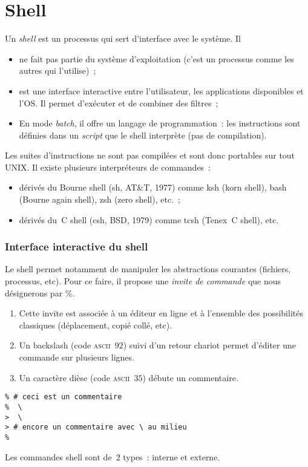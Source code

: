 \section{Shell}
\begin{frame}
Un \textit{shell} est un processus qui sert d'interface avec le syst\`eme. Il
  \begin{itemize}
  \item ne fait pas partie du syst\`eme d'exploitation (c'est un
    processus comme les autres qui l'utilise)~;
  \item est une interface interactive entre l'utilisateur, les
    applications disponibles et l'OS. Il permet d'ex\'ecuter et 
    de combiner des filtres~;
\item En mode \textit{batch}, il offre un langage de programmation~:
les instructions sont d\'efinies dans un \textit{script} que le
shell interpr\`ete (pas de compilation).
  \end{itemize}
  Les suites d'instructions ne sont pas compil\'ees et sont donc  
  portables sur tout UNIX.  Il existe plusieurs interpr\'eteurs de commandes~:
\begin{itemize}
  \item d\'eriv\'es du Bourne shell (sh, AT\&T, 1977) comme ksh (korn
    shell), bash (Bourne again shell), zsh (zero shell), etc.~;
  \item d\'eriv\'es du~C shell (csh, BSD, 1979) comme tcsh (Tenex~C
    shell), etc.
  \end{itemize}
\end{frame}
\begin{frame}[fragile]
  \frametitle{Interface interactive du shell} 
  Le shell permet notamment de manipuler les
  abstractions courantes (fichiers, processus, etc).
  Pour ce faire, il propose une
  \emph{invite de commande} que nous d\'esignerons par \%.
  \begin{enumerate}
  \item Cette invite est associ\'ee \`a un \'editeur en ligne
    et \`a l'ensemble des possibilit\'es classiques
    (d\'eplacement, copi\'e coll\'e, etc).
  \item Un backslash (code \textsc{ascii}~$92$) suivi d'un retour
    chariot permet d'\'editer une commande sur plusieurs lignes.
  \item Un caract\`ere di\`ese (code \textsc{ascii}~$35$) d\'ebute un
    commentaire.
  \end{enumerate}
\begin{verbatim}
% # ceci est un commentaire
%  \
>  \
> # encore un commentaire avec \ au milieu
%
\end{verbatim}
  Les commandes shell sont de~$2$ types~: interne et externe. 
\end{frame}
